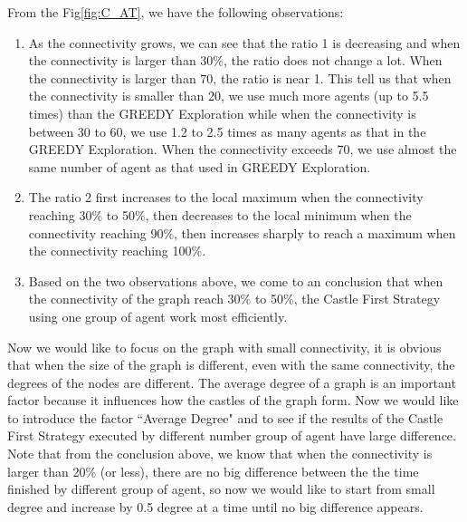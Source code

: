 From the Fig\ref{fig:C_AT}, we have the following observations:
\begin{enumerate}
\item As the connectivity grows, we can see that the ratio 1 is decreasing and when the connectivity is larger than 30\%, the ratio does not change a lot. When the connectivity is larger than 70, the ratio is near 1. This tell us that when the connectivity is smaller than 20, we use much more agents (up to 5.5 times) than the GREEDY Exploration while when the connectivity is between 30 to 60, we use 1.2 to 2.5 times as many agents as that in the GREEDY Exploration. When the connectivity exceeds 70, we use almost the same number of agent as that used in GREEDY Exploration.   
\item The ratio 2 first increases to the local maximum when the connectivity reaching 30\% to 50\%, then decreases to the local minimum when the connectivity reaching 90\%, then increases sharply to reach a maximum when the connectivity reaching 100\%.
\item Based on the two observations above, we come to an conclusion that when the connectivity of the graph reach 30\% to 50\%, the Castle First Strategy using one group of agent work most efficiently.

\end{enumerate}
Now we would like to focus on the graph with small connectivity, it is obvious that when the size of the graph is different, even with the same connectivity, the degrees of the nodes are different. The average degree of a graph is an important factor because it influences how the castles of the graph form. Now we would like to introduce the factor ``Average Degree" and to see if the results of the Castle First Strategy executed by different number group of agent have large difference. Note that from the conclusion above, we know that when the connectivity is larger than 20\% (or less), there are no big difference between the the time finished by different group of agent, so now we would like to start from small degree and increase by 0.5 degree at a time until no big difference appears. 





  









































 